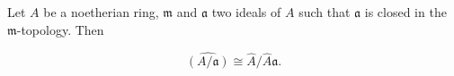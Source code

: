 Let $A$ be a noetherian ring, $\mathfrak{m}$ and $\mathfrak{a}$ two ideals of $A$ such that $\mathfrak{a}$ is closed in the $\mathfrak{m}$-topology. Then

$$\widehat{(A/\mathfrak{a})} \cong \hat{A} / \hat{A}\mathfrak{a}.$$